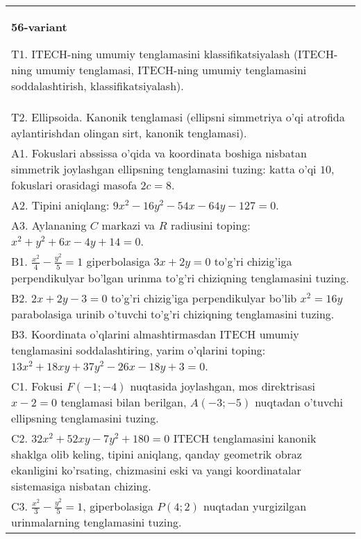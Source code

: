 \documentclass{article}
\begin{document}
\begin{tabular}{m{17cm}}
\textbf{56-variant}
\newline

T1. ITECH-ning umumiy tenglamasini klassifikatsiyalash (ITECH-ning umumiy tenglamasi, ITECH-ning umumiy tenglamasini soddalashtirish, klassifikatsiyalash).\\

T2. Ellipsoida. Kanonik tenglamasi (ellipsni simmetriya o'qi atrofida aylantirishdan olingan sirt, kanonik tenglamasi).\\

A1. Fokuslari abssissa o'qida va koordinata boshiga nisbatan simmetrik joylashgan ellipsning tenglamasini tuzing: katta o'qi $10$, fokuslari orasidagi masofa $2c=8$.\\

A2. Tipini aniqlang: $9x^{2}-16y^{2}-54x-64y-127=0$.\\

A3. Aylananing $C$ markazi va $R$ radiusini toping: $x^2+y^2+6x-4y+14=0$.\\

B1. $\frac{x^{2}}{4} - \frac{y^{2}}{5} = 1$ giperbolasiga $3x + 2y = 0$ to'g'ri chizig'iga perpendikulyar bo'lgan urinma to'g'ri chiziqning tenglamasini tuzing.\\

B2. $2x + 2y - 3 = 0$ to'g'ri chizig'iga perpendikulyar bo'lib $x^{2} = 16y$ parabolasiga urinib o'tuvchi to'g'ri chiziqning tenglamasini tuzing.  \\

B3. Koordinata o'qlarini almashtirmasdan ITECH umumiy tenglamasini soddalashtiring, yarim o'qlarini toping: $13x^{2} + 18xy + 37y^{2} - 26x - 18y + 3 = 0$.  \\

C1. Fokusi $F( - 1; - 4)$ nuqtasida joylashgan, mos direktrisasi $x - 2 = 0$ tenglamasi bilan berilgan, $A( - 3; - 5)$ nuqtadan o'tuvchi ellipsning tenglamasini tuzing.  \\

C2. $32x^{2} + 52xy - 7y^{2} + 180 = 0$ ITECH tenglamasini kanonik shaklga olib keling, tipini aniqlang, qanday geometrik obraz ekanligini ko'rsating, chizmasini eski va yangi koordinatalar sistemasiga nisbatan chizing.  \\

C3. $\frac{x^{2}}{3} - \frac{y^{2}}{5} = 1$, giperbolasiga $P(4;2)$ nuqtadan yurgizilgan urinmalarning tenglamasini tuzing.  \\

\end{tabular}
\vspace{1cm}
\end{document}
